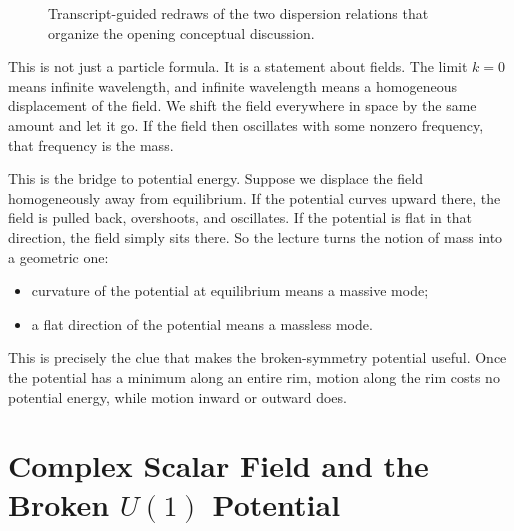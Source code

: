 \begin{figure}[t]
\centering
{}
\hspace{1.2cm}
\caption{Transcript-guided redraws of the two dispersion relations that organize the opening conceptual discussion.}
\end{figure}

This is not just a particle formula. It is a statement about fields. The limit \(k=0\) means infinite wavelength, and infinite wavelength means a homogeneous displacement of the field. We shift the field everywhere in space by the same amount and let it go. If the field then oscillates with some nonzero frequency, that frequency is the mass.

This is the bridge to potential energy. Suppose we displace the field homogeneously away from equilibrium. If the potential curves upward there, the field is pulled back, overshoots, and oscillates. If the potential is flat in that direction, the field simply sits there. So the lecture turns the notion of mass into a geometric one:

\begin{itemize}
\item curvature of the potential at equilibrium means a massive mode;
\item a flat direction of the potential means a massless mode.
\end{itemize}

This is precisely the clue that makes the broken-symmetry potential useful. Once the potential has a minimum along an entire rim, motion along the rim costs no potential energy, while motion inward or outward does.

\section{Complex Scalar Field and the Broken \(U(1)\) Potential}


